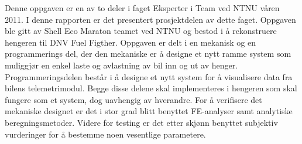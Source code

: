 Denne oppgaven er en av to deler i faget Eksperter i Team ved NTNU våren 2011. I denne rapporten er det presentert prosjektdelen av dette faget. Oppgaven ble gitt av Shell Eco Maraton teamet ved NTNU og bestod i å rekonstruere hengeren til DNV Fuel Figther. Oppgaven er delt i en mekanisk og en programmerings del, der den mekaniske er å designe et nytt ramme system som muliggjør en enkel laste og avlastning av bil inn og ut av henger. Programmeringsdelen består i å designe et nytt system for å visualisere data fra bilens telemetrimodul. Begge disse delene skal implementeres i hengeren som skal fungere som et system, dog uavhengig av hverandre. 
For å verifisere det mekaniske designet er det i stor grad blitt benyttet FE-analyser samt analytiske beregningsmetoder. Videre for testing er det etter skjønn benyttet subjektiv vurderinger for å bestemme noen vesentlige parametere. 
